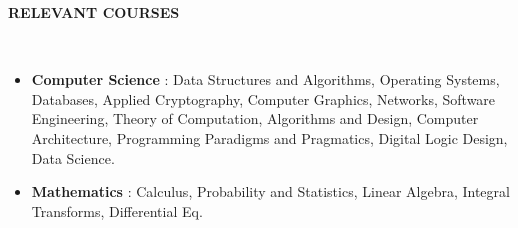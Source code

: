 \documentclass[a4paper,10pt]{article}
\newcommand{\lsep}{-0.6cm}
\newcommand{\resheading}[1]{{\small \colorbox{mygrey}{\begin{minipage}{0.975\textwidth}{\textbf{#1 \vphantom{p\^{E}}}}\end{minipage}}}}
\begin{document}
\resheading{\textbf{RELEVANT COURSES} }\\[\lsep]
\vspace{1.0pt}
\begin{itemize}[itemsep=0.1pt]
\item \noindent \textbf{Computer Science} : Data Structures and Algorithms, Operating Systems, Databases, Applied Cryptography, Computer Graphics, Networks, Software Engineering, Theory of Computation,  Algorithms and Design, Computer Architecture,
Programming Paradigms and Pragmatics, Digital Logic Design, Data Science.
\item \noindent \textbf{Mathematics} : Calculus, Probability and Statistics, Linear Algebra, Integral Transforms, Differential Eq.
\end{itemize}
\end{document}
